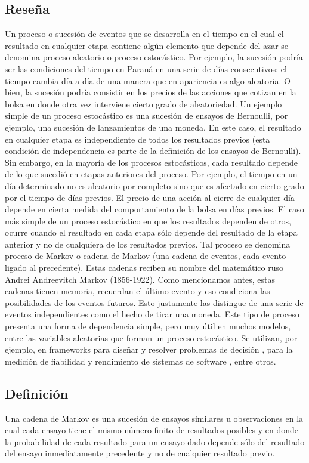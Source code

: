 \subsection{Reseña}
Un proceso o sucesión de eventos que se desarrolla en el tiempo en el cual el resultado en cualquier etapa contiene algún elemento que depende del azar se denomina proceso aleatorio o proceso estocástico. Por ejemplo, la sucesión podría ser las condiciones del tiempo en Paraná en una serie de días consecutivos: el tiempo cambia día a día de una manera que en apariencia es algo aleatoria. O bien, la sucesión podría consistir en los precios de las acciones que cotizan en la bolsa en donde otra vez interviene cierto grado de aleatoriedad.
Un ejemplo simple de un proceso estocástico es una sucesión de ensayos de Bernoulli, por ejemplo, una sucesión de lanzamientos de una moneda. En este caso, el resultado en cualquier etapa es independiente de todos los resultados previos (esta condición de independencia es parte de la definición de los ensayos de Bernoulli). Sin embargo, en la mayoría de los procesos estocásticos, cada resultado depende de lo que sucedió en etapas anteriores del proceso. Por ejemplo, el tiempo en un día determinado no es aleatorio por completo sino que es afectado en cierto grado por el tiempo de días previos. El precio de una acción al cierre de cualquier día depende en cierta medida del comportamiento de la bolsa en días previos.
El caso más simple de un proceso estocástico en que los resultados dependen de otros, ocurre cuando el resultado en cada etapa sólo depende del resultado de la etapa anterior y no de cualquiera de los resultados previos. Tal proceso se denomina proceso de Markov o cadena de Markov (una cadena de eventos, cada evento ligado al precedente). Estas cadenas reciben su nombre del matemático ruso Andrei Andreevitch Markov (1856-1922). Como mencionamos antes, estas cadenas tienen memoria, recuerdan el último evento y eso condiciona las posibilidades de los eventos futuros. Esto justamente las distingue de una serie de eventos independientes como el hecho de tirar una moneda. Este tipo de proceso presenta una forma de dependencia simple, pero muy útil en muchos modelos, entre las variables aleatorias que forman un proceso estocástico. Se utilizan, por ejemplo, en frameworks para diseñar y resolver problemas de decisión \cite{beccuti2007framework}, para la medición de fiabilidad y rendimiento de sistemas de software \cite{goel1899markovian}, entre otros.

\subsection{Definición}
Una cadena de Markov es una sucesión de ensayos similares u observaciones en la cual cada ensayo tiene el mismo número finito de resultados posibles y en donde la probabilidad de cada resultado para un ensayo dado depende sólo del resultado del ensayo inmediatamente precedente y no de cualquier resultado previo.

